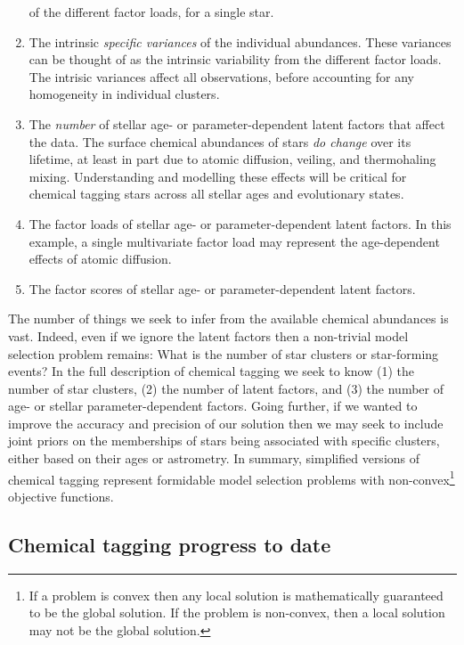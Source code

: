 \documentclass{aastex61}
\begin{document}
\begin{enumerate}
        of the different factor loads, for a single star.
  \item The intrinsic \emph{specific variances} of the individual abundances.
        These variances can be thought of as the intrinsic variability from 
        the different factor loads.
        The intrisic variances affect all observations, before accounting for
        any homogeneity in individual clusters.
  \item The \emph{number} of stellar age- or parameter-dependent latent 
        factors that affect the data. 
        The surface chemical abundances of stars \emph{do change} over its
        lifetime, at least in part due to atomic diffusion, veiling, and 
        thermohaling mixing.
        Understanding and modelling these effects will be critical for 
        chemical tagging stars across all stellar ages and evolutionary states.
  \item The factor loads of stellar age- or parameter-dependent latent factors.
        In this example, a single multivariate factor load may represent the
        age-dependent effects of atomic diffusion.
  \item The factor scores of stellar age- or parameter-dependent latent 
        factors.
\end{enumerate}


The number of things we seek to infer from the available chemical abundances
is vast.
Indeed, even if we ignore the latent factors then a non-trivial model
selection problem remains: What is the number of star clusters or star-forming 
events?
In the full description of chemical tagging we seek to know (1) the number of
star clusters, (2) the number of latent factors, and (3) the number of age-
or stellar parameter-dependent factors.
Going further, if we wanted to improve the accuracy and precision of our
solution then we may seek to include joint priors on the memberships of stars
being associated with specific clusters, either based on their ages or
astrometry.
In summary, simplified versions of chemical tagging represent formidable model
selection problems with non-convex\footnote{
  If a problem is convex then any local solution is mathematically guaranteed
  to be the global solution.
  If the problem is non-convex, then a local solution may not be the global
  solution.
} objective functions.


\subsection{Chemical tagging progress to date}
\label{sec:literature-review}
\end{document}
